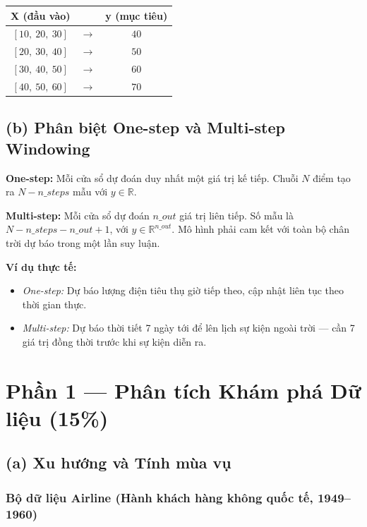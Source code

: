 \documentclass[12pt,a4paper]{article}
\begin{document}
\begin{center}
\begin{tabular}{ccc}
\toprule
\textbf{X (đầu vào)} & & \textbf{y (mục tiêu)} \\
\midrule
$[10,\ 20,\ 30]$ & $\rightarrow$ & $40$ \\
$[20,\ 30,\ 40]$ & $\rightarrow$ & $50$ \\
$[30,\ 40,\ 50]$ & $\rightarrow$ & $60$ \\
$[40,\ 50,\ 60]$ & $\rightarrow$ & $70$ \\
\bottomrule
\end{tabular}
\end{center}

\subsection{(b) Phân biệt One-step và Multi-step Windowing}

\textbf{One-step:} Mỗi cửa sổ dự đoán duy nhất một giá trị kế tiếp. Chuỗi $N$ điểm tạo ra $N - n\_steps$ mẫu với $y \in \mathbb{R}$.

\textbf{Multi-step:} Mỗi cửa sổ dự đoán $n\_out$ giá trị liên tiếp. Số mẫu là $N - n\_steps - n\_out + 1$, với $y \in \mathbb{R}^{n\_out}$. Mô hình phải cam kết với toàn bộ chân trời dự báo trong một lần suy luận.

\textbf{Ví dụ thực tế:}
\begin{itemize}[leftmargin=*]
    \item \textit{One-step:} Dự báo lượng điện tiêu thụ giờ tiếp theo, cập nhật liên tục theo thời gian thực.
    \item \textit{Multi-step:} Dự báo thời tiết 7 ngày tới để lên lịch sự kiện ngoài trời --- cần 7 giá trị đồng thời trước khi sự kiện diễn ra.
\end{itemize}

\section{Phần 1 --- Phân tích Khám phá Dữ liệu (15\%)}

\subsection{(a) Xu hướng và Tính mùa vụ}

\subsubsection*{Bộ dữ liệu Airline (Hành khách hàng không quốc tế, 1949--1960)}
\end{document}
